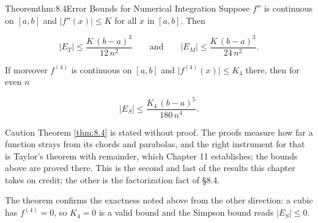 \documentclass[a4paper,12pt,oneside]{memoir}
\begin{document}
\begin{envtheorem}{Theorem}{thm:8.4}{Error Bounds for Numerical Integration}
Suppose \(f''\) is continuous on \([a, b]\) and \(\lvert f''(x)\rvert \le K\) for all \(x\) in \([a, b]\). Then

\[ \lvert E_{T}\rvert \le \frac{K\,(b - a)^{3}}{12\,n^{2}} \qquad\text{and}\qquad \lvert E_{M}\rvert \le \frac{K\,(b - a)^{3}}{24\,n^{2}}. \]

If moreover \(f^{(4)}\) is continuous on \([a, b]\) and \(\lvert f^{(4)}(x)\rvert \le K_{4}\) there, then for even \(n\)

\[ \lvert E_{S}\rvert \le \frac{K_{4}\,(b - a)^{5}}{180\,n^{4}}. \]
\end{envtheorem}
\begin{envcaution}{Caution}{}{}
Theorem \ref{thm:8.4} is stated without proof. The proofs measure how far a function strays from its chords and parabolas, and the right instrument for that is Taylor’s theorem with remainder, which Chapter 11 establishes; the bounds above are proved there. This is the second and last of the results this chapter takes on credit; the other is the factorization fact of §8.4.
\end{envcaution}
The theorem confirms the exactness noted above from the other direction: a cubic has \(f^{(4)} = 0\), so \(K_{4} = 0\) is a valid bound and the Simpson bound reads \(\lvert E_{S}\rvert \le 0\).
\end{document}
